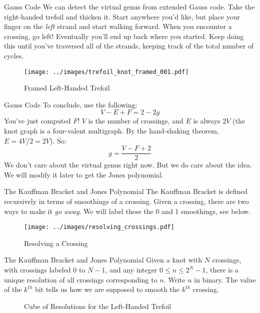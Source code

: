 \documentclass{beamer}
\begin{document}
    \begin{frame}{Gauss Code}
        We can detect the virtual genus from extended Gauss code. Take the
        right-handed trefoil and thicken it. Start anywhere you'd like, but
        place your finger on the \textit{left} strand and start walking forward.
        When you encounter a crossing, go left! Eventually you'll end up back
        where you started. Keep doing this until you've traversed all of the
        strands, keeping track of the total number of cycles.
        \begin{figure}
            \centering
            \texttt{[image: ../images/trefoil\_knot\_framed\_001.pdf]}
            \caption{Framed Left-Handed Trefoil}
            \label{fig:trefoil_knot_framed_001}
        \end{figure}
    \end{frame}
    \begin{frame}{Gauss Code}
        To conclude, use the following:
        \begin{equation}
            V-E+F=2-2g
        \end{equation}
        You've just computed $F$! $V$ is the number of crossings, and
        $E$ is always $2V$ (the knot graph is a four-valent multigraph. By the
        hand-shaking theorem, $E=4V/2=2V$). So:
        \begin{equation}
            g=\frac{V-F+2}{2}
        \end{equation}
        We don't care about the virtual genus right now. But we do care about
        the idea. We will modify it later to get the Jones polynomial.
    \end{frame}
    \begin{frame}{The Kauffman Bracket and Jones Polynomial}
        The Kauffman Bracket is defined recursively in terms of smoothings of a
        crossing. Given a crossing, there are two ways to make it
        \textit{go away}. We will label these the 0 and 1 smoothings, see below.
        \begin{figure}
            \centering
            \texttt{[image: ../images/resolving\_crossings.pdf]}
            \caption{Resolving a Crossing}
            \label{fig:resolving_crossing}
        \end{figure}
    \end{frame}
    \begin{frame}{The Kauffman Bracket and Jones Polynomial}
        Given a knot with $N$ crossings, with crossings labeled 0 to $N-1$,
        and any integer $0\leq{n}\leq{2}^{N}-1$, there is a unique resolution of
        all crossings corresponding to $n$. Write $n$ in binary. The value of
        the $k^{th}$ bit tells us how we are supposed to smooth the $k^{th}$
        crossing.
        \begin{figure}
            \centering
            \caption{Cube of Resolutions for the Left-Handed Trefoil}
            \label{fig:trefoil_knot_cube_of_resolutions}
        \end{figure}
    \end{frame}
\end{document}
